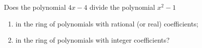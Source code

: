 Does the polynomial $4x-4$ divide the polynomial $x^2-1$
\begin{enumerate}
\item[(a)] in the ring of polynomials with rational (or real) coefficients;
\item[(b)] in the ring of polynomials with integer coefficients?
\end{enumerate}
